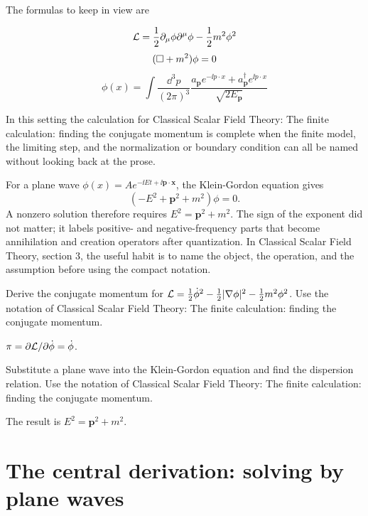 The formulas to keep in view are

\[
  \mathcal L=\frac12\partial_\mu\phi\partial^\mu\phi-\frac12m^2\phi^2
\]
\[
  (\Box+m^2)\phi=0
\]
\[
  \phi(x)=\int\frac{\dd^3p}{(2\pi)^3}\frac{a_{\bm p}e^{-\ii p\cdot x}+a_{\bm p}^\dagger e^{\ii p\cdot x}}{\sqrt{2E_{\bm p}}}
\]

In this setting the calculation for Classical Scalar Field Theory: The finite calculation: finding the conjugate momentum is complete when the finite model, the limiting step, and the normalization or boundary condition can all be named without looking back at the prose.




\begin{example}
For a plane wave \(\phi(x)=Ae^{-\ii Et+\ii\bm p\cdot\bm x}\), the Klein-Gordon equation gives
\[
  (-E^2+\bm p^2+m^2)\phi=0.
\]
A nonzero solution therefore requires \(E^2=\bm p^2+m^2\).  The sign of the exponent did not matter; it labels positive- and negative-frequency parts that become annihilation and creation operators after quantization.  In Classical Scalar Field Theory, section 3, the useful habit is to name the object, the operation, and the assumption before using the compact notation.
\end{example}



\begin{exercise}
Derive the conjugate momentum for \(\mathcal L=\frac12\dot\phi^2-\frac12|\nabla\phi|^2-\frac12m^2\phi^2\).  Use the notation of Classical Scalar Field Theory: The finite calculation: finding the conjugate momentum.
\begin{answer}
\(\pi=\partial\mathcal L/\partial\dot\phi=\dot\phi\).
\end{answer}
\end{exercise}

\begin{exercise}
Substitute a plane wave into the Klein-Gordon equation and find the dispersion relation.  Use the notation of Classical Scalar Field Theory: The finite calculation: finding the conjugate momentum.
\begin{answer}
The result is \(E^2=\bm p^2+m^2\).
\end{answer}
\end{exercise}



\section{The central derivation: solving by plane waves}

